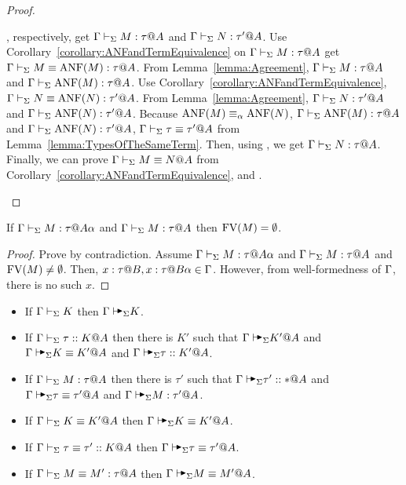 \begin{proof}
\begin{rneqncase}{\QAANF}
        \), respectively, get \( \Gamma \vdash_\Sigma M : \tau @ A \) and \( \Gamma \vdash_\Sigma N : \tau' @
        A \). Use Corollary~\ref{corollary:ANFandTermEquivalence} on \( \Gamma \vdash_\Sigma M
        : \tau @ A \)  get \( \Gamma \vdash_\Sigma M \equiv \text{ANF}(M) : \tau @ A \).  From
        Lemma~\ref{lemma:Agreement}, \( \Gamma \vdash_\Sigma M : \tau @ A \) and \( \Gamma \vdash_\Sigma
        \text{ANF}(M) : \tau @ A \).  Use
        Corollary~\ref{corollary:ANFandTermEquivalence}, \( \Gamma \vdash_\Sigma N \equiv \text{ANF}(N)
        : \tau' @ A \). From Lemma~\ref{lemma:Agreement}, \( \Gamma \vdash_\Sigma N : \tau' @
        A \) and \( \Gamma \vdash_\Sigma \text{ANF}(N) : \tau' @ A \).  Because \( \text{ANF}(M) \equiv_\alpha
        \text{ANF}(N) \), \( \Gamma \vdash_\Sigma \text{ANF}(M) : \tau @ A \) and \( \Gamma \vdash_\Sigma \text{ANF}(N) : \tau'
        @ A \), \( \Gamma \vdash_\Sigma \tau \equiv \tau' @ A \) from
        Lemma~\ref{lemma:TypesOfTheSameTerm}.  Then, using \TConv, we get \( \Gamma \vdash_\Sigma N
        : \tau @ A \). Finally, we can prove \( \Gamma \vdash_\Sigma M \equiv N@A \) from
        Corollary~\ref{corollary:ANFandTermEquivalence}, \QTrans and \QSym.
    \end{rneqncase}
\end{proof}

\begin{lemma}
    \label{lemma:FreeVariableandStage}
    If \( \G\V M:\tau@{A\alpha} \) and \( \Gamma\vdash_\Sigma M:\tau @A \) then \( \text{FV}(M) = \emptyset \).
\end{lemma}

\begin{proof}
    Prove by contradiction. Assume \( \G\V M:\tau@{A\alpha} \) and \( \Gamma\vdash_\Sigma
    M:\tau @A \) and \( \text{FV}(M) \neq \emptyset \). Then, \( x : \tau @ B, x:
    \tau @ B\alpha \in \Gamma \). However, from well-formedness of \( \Gamma \), there
    is no such \( x \).
\end{proof}

\begin{theorem}
    \label{theorem:CompletenessofAlgorithmicTyping}
    \begin{itemize}
        \item If \(\Gamma\vdash_\Sigma K \) then \(\G\AVS K \).
        \item If \(\Gamma\vdash_\Sigma \tau ::K @ A \) then there is \(K'\) such that \( \G \AVS K' @ A \) and \( \G \AVS K\E K' @ A \) and \( \G\AVS \tau :: K' @ A \).
        \item If \(\Gamma\vdash_\Sigma M:\tau @ A \) then there is \(\tau'\) such that \( \G \AVS \tau' :: * @ A \) and \( \G \AVS \tau \E \tau' @ A \) and \( \G\AVS M:\tau' @ A \).
        \item If \(\Gamma\vdash_\Sigma K\equiv K' @ A \) then \(\G\AVS K\E K' @ A \).
        \item If \(\Gamma\vdash_\Sigma \tau \equiv \tau' :: K @ A \) then \(\G\AVS \tau \E \tau' @ A \).
        \item If \(\Gamma\vdash_\Sigma M\equiv M' : \tau @ A \) then \(\G \AVS M \E M' @ A \).
    \end{itemize}
\end{theorem}

